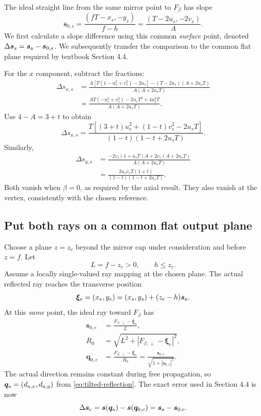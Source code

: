 \documentclass[11pt,a4paper]{article}
\numberwithin{equation}{section}
\newcommand{\vct}[1]{\bm{#1}}
\begin{document}
The ideal straight line from the same mirror point to $F_\beta$ has slope
\begin{equation}
 \vct s_{0,s}
 =\frac{(fT-x_s,-y_s)}{f-h}
 =\frac{(T-2u_s,-2v_s)}{A}.
 \label{eq:surface-ideal-slope}
\end{equation}
We first calculate a slope difference using this common \emph{surface}
point, denoted $\Delta\vct s_s=\vct s_{\rm a}-\vct s_{0,s}$.
We subsequently transfer the comparison to the common flat plane
required by textbook Section 4.4.

For the $x$ component, subtract the fractions:
\begin{align}
 \Delta s_{x,s}
 &=\frac{A[T(1-u_s^2+v_s^2)-2u_s]
           -(T-2u_s)(A+2u_sT)}
         {A(A+2u_sT)}\\
 &=\frac{AT(-u_s^2+v_s^2)-2u_sT^2+4u_s^2T}
         {A(A+2u_sT)}.
\end{align}
Use $4-A=3+t$ to obtain
\begin{equation}
 \boxed{\Delta s_{x,s}
 =\frac{T[(3+t)u_s^2+(1-t)v_s^2-2u_sT]}
         {(1-t)(1-t+2u_sT)}.}
 \label{eq:mirror-dsx}
\end{equation}
Similarly,
\begin{align}
 \Delta s_{y,s}
 &=\frac{-2v_s(1+u_sT)A+2v_s(A+2u_sT)}
         {A(A+2u_sT)}\\
 &=\boxed{\frac{2u_sv_sT(1+t)}
         {(1-t)(1-t+2u_sT)}}.
 \label{eq:mirror-dsy}
\end{align}
Both vanish when $\beta=0$, as required by the axial result.
They also vanish at the vertex, consistently with the chosen reference.

\subsection{Put both rays on a common flat output plane}
\label{sec:mirror-plane}
Choose a plane $z=z_e$ beyond the mirror cap under consideration and
before $z=f$. Let
\[
 L=f-z_e>0,\qquad h\leq z_e.
\]
Assume a locally single-valued ray mapping at the chosen plane.
The actual reflected ray reaches the transverse position
\begin{equation}
 \vct\xi_e=(x_e,y_e)
 =(x_s,y_s)+(z_e-h)\vct s_{\rm a}.
 \label{eq:mirror-plane-map}
\end{equation}
At this \emph{same} point, the ideal ray toward $F_\beta$ has
\begin{align}
 \vct s_{0,e}
 &=\frac{F_{\beta,\perp}-\vct\xi_e}{L},\\
 R_0&=\sqrt{L^2+|F_{\beta,\perp}-\vct\xi_e|^2},\\
 \vct q_{0,e}
 &=\frac{F_{\beta,\perp}-\vct\xi_e}{R_0}
 =\frac{\vct s_{0,e}}{\sqrt{1+|\vct s_{0,e}|^2}}.
 \label{eq:mirror-plane-reference}
\end{align}
The actual direction remains constant during free propagation, so
$\vct q_{\rm a}=(d_{{\rm a},x},d_{{\rm a},y})$ from
\eqref{eq:tilted-reflection}.
The exact error used in Section 4.4 is now
\begin{equation}
 \Delta\vct s_e
 =\vct s(\vct q_{\rm a})-\vct s(\vct q_{0,e})
 =\vct s_{\rm a}-\vct s_{0,e}.
 \label{eq:mirror-plane-ds}
\end{equation}
\end{document}
